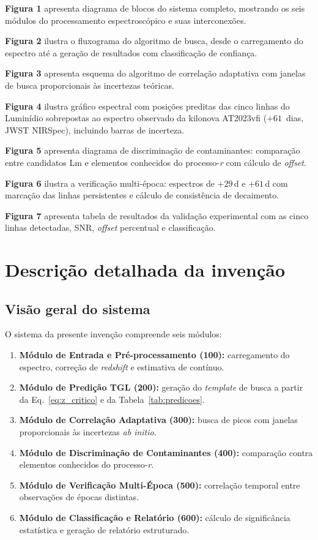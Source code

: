 \documentclass[12pt,a4paper]{article}
\begin{document}
\textbf{Figura 1} apresenta diagrama de blocos do sistema completo,
mostrando os seis módulos do processamento espectroscópico e suas
interconexões.

\textbf{Figura 2} ilustra o fluxograma do algoritmo de busca,
desde o carregamento do espectro até a geração de resultados com
classificação de confiança.

\textbf{Figura 3} apresenta esquema do algoritmo de correlação
adaptativa com janelas de busca proporcionais às incertezas
teóricas.

\textbf{Figura 4} ilustra gráfico espectral com posições preditas
das cinco linhas do Luminídio sobrepostas ao espectro observado da
kilonova AT2023vfi ($+61$~dias, JWST NIRSpec), incluindo barras de
incerteza.

\textbf{Figura 5} apresenta diagrama de discriminação de
contaminantes: comparação entre candidatos Lm e elementos
conhecidos do processo-\textit{r} com cálculo de \textit{offset}.

\textbf{Figura 6} ilustra a verificação multi-época: espectros
de $+29$\,d e $+61$\,d com marcação das linhas persistentes e
cálculo de consistência de decaimento.

\textbf{Figura 7} apresenta tabela de resultados da validação
experimental com as cinco linhas detectadas, SNR, \textit{offset}
percentual e classificação.

\newpage
\section{Descrição detalhada da invenção}

\subsection{Visão geral do sistema}

O sistema da presente invenção compreende seis módulos:

\begin{enumerate}[leftmargin=*]
\item \textbf{Módulo de Entrada e Pré-processamento (100):}
carregamento do espectro, correção de \textit{redshift} e
estimativa de contínuo.
\item \textbf{Módulo de Predição TGL (200):} geração do
\textit{template} de busca a partir da Eq.~\ref{eq:z_critico}
e da Tabela~\ref{tab:predicoes}.
\item \textbf{Módulo de Correlação Adaptativa (300):} busca de
picos com janelas proporcionais às incertezas \textit{ab initio}.
\item \textbf{Módulo de Discriminação de Contaminantes (400):}
comparação contra elementos conhecidos do processo-\textit{r}.
\item \textbf{Módulo de Verificação Multi-Época (500):}
correlação temporal entre observações de épocas distintas.
\item \textbf{Módulo de Classificação e Relatório (600):}
cálculo de significância estatística e geração de relatório
estruturado.
\end{enumerate}
\end{document}
